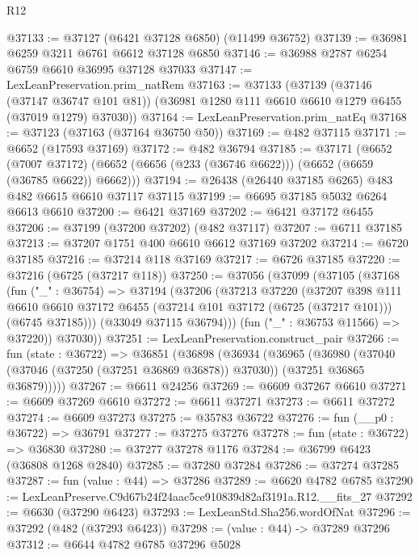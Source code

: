 \begin{lexlean}{R12}
\begin{coremodule}
@37133 := @37127 (@6421 @37128 @6850) (@11499 @36752)
@37139 := @36981 @6259 @3211 @6761 @6612 @37128 @6850
@37146 := @36988 @2787 @6254 @6759 @6610 @36995 @37128 @37033
@37147 := LexLeanPreservation.prim_natRem
@37163 := @37133
    (@37139
      (@37146 (@37147 @36747 @101 @81))
      (@36981 @1280 @111 @6610 @6610 @1279 @6455 (@37019 @1279) @37030))
@37164 := LexLeanPreservation.prim_natEq
@37168 := @37123 (@37163 (@37164 @36750 @50))
@37169 := @482 @37115
@37171 := @6652 (@17593 @37169)
@37172 := @482 @36794
@37185 := @37171
    (@6652
      (@7007 @37172)
      (@6652 (@6656 (@233 (@36746 @6622))) (@6652 (@6659 (@36785 @6622)) @6662)))
@37194 := @26438 (@26440 @37185 @6265) @483 @482 @6615 @6610 @37117 @37115
@37199 := @6695 @37185 @5032 @6264 @6613 @6610
@37200 := @6421 @37169
@37202 := @6421 @37172 @6455
@37206 := @37199 (@37200 @37202) (@482 @37117)
@37207 := @6711 @37185
@37213 := @37207 @1751 @400 @6610 @6612 @37169 @37202
@37214 := @6720 @37185
@37216 := @37214 @118 @37169
@37217 := @6726 @37185
@37220 := @37216 (@6725 (@37217 @118))
@37250 := @37056
    (@37099
      (@37105
        (@37168
          (fun ("_" : @36754) =>
          @37194
            (@37206
              (@37213
                @37220
                (@37207
                  @398
                  @111
                  @6610
                  @6610
                  @37172
                  @6455
                  (@37214 @101 @37172 (@6725 (@37217 @101)))
                  (@6745 @37185)))
              (@33049 @37115 @36794)))
          (fun ("_" : @36753 @11566) => @37220))
        @37030))
@37251 := LexLeanPreservation.construct_pair
@37266 := fun (state : @36722) =>
  @36851
    (@36898
      (@36934
        (@36965
          (@36980
            (@37040 (@37046 (@37250 (@37251 @36869 @36878)) @37030))
            (@37251 @36865 @36879)))))
@37267 := @6611 @24256
@37269 := @6609 @37267 @6610
@37271 := @6609 @37269 @6610
@37272 := @6611 @37271
@37273 := @6611 @37272
@37274 := @6609 @37273
@37275 := @35783 @36722
@37276 := fun (__p0 : @36722) => @36791
@37277 := @37275 @37276
@37278 := fun (state : @36722) => @36830
@37280 := @37277 @37278 @1176
@37284 := @36799 @6423 (@36808 @1268 @2840)
@37285 := @37280 @37284
@37286 := @37274 @37285
@37287 := fun (value : @44) => @37286
@37289 := @6620 @4782 @6785
@37290 := LexLeanPreserve.C9d67b24f24aac5ce910839d82af3191a.R12.__fits_27
@37292 := @6630 (@37290 @6423)
@37293 := LexLeanStd.Sha256.wordOfNat
@37296 := @37292 (@482 (@37293 @6423))
@37298 := (value : @44) -> @37289 @37296
@37312 := @6644
    @4782
    @6785
    @37296
    @5028

\end{coremodule}
\end{lexlean}
